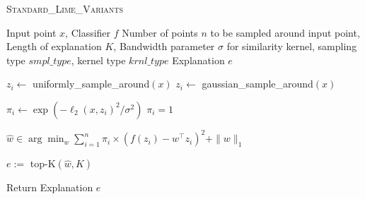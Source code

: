 \begin{algorithm}[tbh]
\begin{algorithmic}[1]
 \caption{\textsc{Standard\_Lime\_Variants}}
   \label{alg:limevarinclear}
    
     Input point $x$, Classifier $f$
     Number of points $n$ to be sampled around input point, Length of explanation $K$, Bandwidth parameter $\sigma$ for similarity kernel, sampling type $smpl\_type$, kernel type $krnl\_type$
     Explanation $e$
    \STATE
    
        \STATE $z_i \leftarrow$ \rm{uniformly\_sample\_around}$\left(x\right)$
        \STATE $z_i \leftarrow$ \rm{gaussian\_sample\_around}$\left(x\right)$
    \ENDIF

        \STATE $\pi_i \leftarrow \exp \left(-\ell_2(x, z_i)^2 / \sigma^2\right)$
    \ELSE
        \STATE $\pi_i = 1$
    \ENDIF
    \ENDFOR

    \STATE $\hat{w} \in \arg \min _{w} \sum_{i=1}^n \pi_i \times \left(f\left(z_i\right)-w^{\top} z_i\right)^2+\|w\|_1$

    \STATE $e :=$ top-K$(\hat{w}, K)$
    
    \STATE Return Explanation $e$
\end{algorithmic}
\end{algorithm}